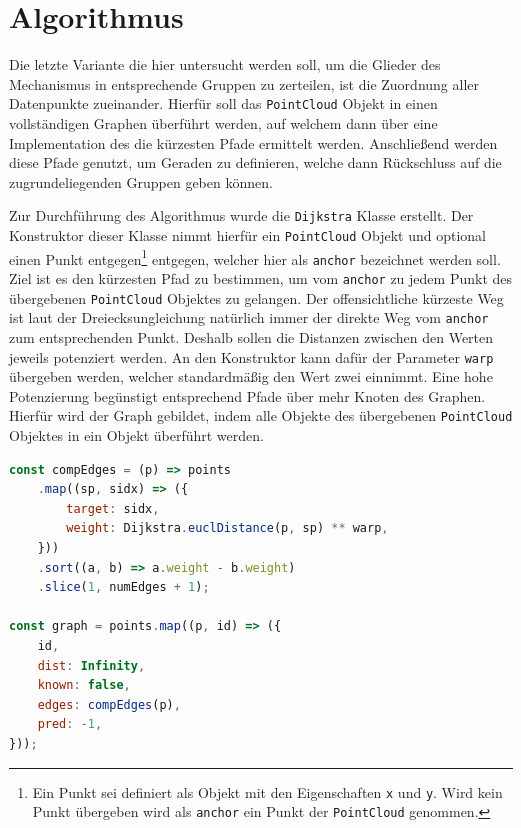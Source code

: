 \section{ Algorithmus}\label{ch:dijkstra}

Die letzte Variante die hier untersucht werden soll, um die Glieder des Mechanismus in entsprechende Gruppen zu zerteilen, ist die Zuordnung aller Datenpunkte zueinander.
Hierfür soll das \lstinline{PointCloud} Objekt in einen vollständigen Graphen überführt werden, auf welchem dann über eine Implementation des  die kürzesten Pfade ermittelt werden.
Anschlie{\ss}end werden diese Pfade genutzt, um Geraden zu definieren, welche dann Rückschluss auf die zugrundeliegenden Gruppen geben können.

Zur Durchführung des  Algorithmus wurde die \lstinline{Dijkstra} Klasse erstellt.
Der Konstruktor dieser Klasse nimmt hierfür ein \lstinline{PointCloud} Objekt und optional einen Punkt entgegen\footnote{Ein Punkt sei definiert als Objekt mit den Eigenschaften \lstinline{x} und \lstinline{y}. Wird kein Punkt übergeben wird als \lstinline{anchor} ein Punkt der \lstinline{PointCloud} genommen.} entgegen, welcher hier als \lstinline{anchor} bezeichnet werden soll.
Ziel ist es den kürzesten Pfad zu bestimmen, um vom \lstinline{anchor} zu jedem Punkt des übergebenen \lstinline{PointCloud} Objektes zu gelangen.
Der offensichtliche kürzeste Weg ist laut der Dreiecksungleichung natürlich immer der direkte Weg vom \lstinline{anchor} zum entsprechenden Punkt.
Deshalb sollen die Distanzen zwischen den Werten jeweils potenziert werden.
An den Konstruktor kann dafür der Parameter \lstinline{warp} übergeben werden, welcher standardmä{\ss}ig den Wert zwei einnimmt.
Eine hohe Potenzierung begünstigt entsprechend Pfade über mehr Knoten des Graphen.
Hierfür wird der Graph gebildet, indem alle Objekte des übergebenen \lstinline{PointCloud} Objektes in ein Objekt überführt werden.

\begin{lstlisting}[language=JavaScript, caption={Im \lstinline{Dijkstra} Konstruktor werden die Punkte des übergebenen \lstinline{PointCloud} Objektes in einen Graphen überführt.}, label={lst:dijkstra_points_graph}]
const compEdges = (p) => points
    .map((sp, sidx) => ({
        target: sidx,
        weight: Dijkstra.euclDistance(p, sp) ** warp,
    }))
    .sort((a, b) => a.weight - b.weight)
    .slice(1, numEdges + 1);

const graph = points.map((p, id) => ({
    id,
    dist: Infinity,
    known: false,
    edges: compEdges(p),
    pred: -1,
}));
\end{lstlisting}

